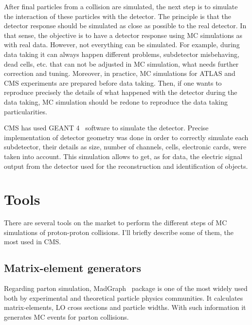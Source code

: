 After final particles from a collision are simulated, the next step is to simulate the interaction of these particles with the detector. The principle is that the detector response should be simulated as close as possible to the real detector. In that sense, the objective is to have a detector response using MC simulations as with real data. However, not everything can be simulated. For example, during data taking it can always happen different problems, subdetector misbehaving, dead cells, etc. that can not be adjusted in MC simulation, what needs further correction and tuning. Moreover, in practice, MC simulations for ATLAS and CMS experiments are prepared before data taking. Then, if one wants to reproduce precisely the details of what happened with the detector during the data taking, MC simulation should be redone to reproduce the data taking particularities. 

CMS has used GEANT 4~\cite{Agostinelli:2002hh} software to simulate the detector. Precise implementation of detector geometry was done in order to correctly simulate each subdetector, their details as size, number of channels, cells, electronic cards, were taken into account. This simulation allows to get, as for data, the electric signal output from the detector used for the reconstruction and identification of objects. 


\section{Tools}
\label{sec:tools}

There are several tools on the market to perform the different steps of MC simulations of proton-proton collisions. I'll briefly describe some of them, the most used in CMS.

\subsection{Matrix-element generators}
\label{sec:ME}

Regarding parton simulation, MadGraph~\cite{Alwall:2014hca, Alwall:2011uj} package is one of the most widely used both by experimental and theoretical particle physics communities. It calculates matrix-elements, LO cross sections and particle widths. With such information it generates MC events for parton collisions. 

